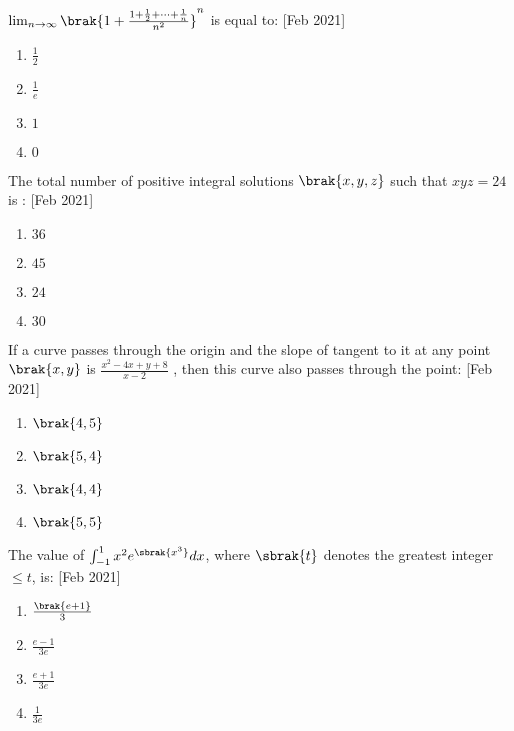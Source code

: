 \iffalse
  \title{Assignment}
  \author{EE24BTECH11044}
  \section{mcq-single}
\fi 
\item $\lim_{n \to \infty}\brak{1+\frac{1+\frac{1}{2}+\dots+\frac{1}{n}}{n^2}}^n$ is equal to: \hfill{[Feb 2021]}	
	\begin{enumerate}
			\item $\frac{1}{2}$\\
			\item $\frac{1}{e}$\\
			\item $1$\\
			\item $0$
		\end{enumerate}
	\item The total number of positive integral solutions $\brak{x,y,z}$ such that $xyz = 24$ is : \hfill{[Feb 2021]}
		\begin{enumerate}
			\item $36$\\
			\item $45$\\
			\item $24$\\
			\item $30$
		\end{enumerate}
	\item If a curve passes through the origin and the slope of tangent to it at any point $\brak{x,y}$ is $\frac{x^2-4x+y+8}{x-2}$ , then this curve also passes through the point: \hfill{[Feb 2021]}
		\begin{enumerate}
			\item $\brak{4, 5}$\\
			\item $\brak{5, 4}$\\
			\item $\brak{4, 4}$\\
			\item $\brak{5, 5}$
		\end{enumerate}
	\item The value of $\int_{-1}^{1} x^2e^{\sbrak{x^3}} dx$, where $\sbrak{t}$ denotes the greatest integer $\leq t$, is: \hfill{[Feb 2021]}
		\begin{enumerate}
			\item $\frac{\brak{e+1}}{3}$\\
			\item $\frac{e-1}{3e}$\\
			\item $\frac{e+1}{3e}$\\
			\item $\frac{1}{3e}$
		\end{enumerate}
